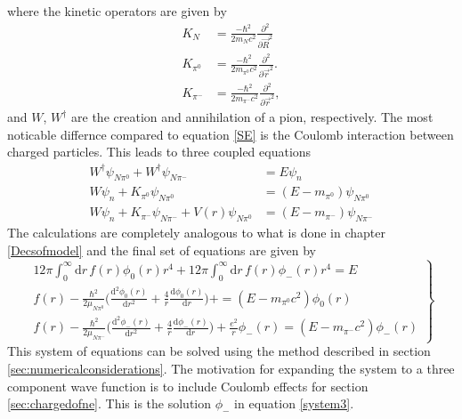 where the kinetic operators are given by
\begin{align} \label{multiNNeutron}
	K_N &= \frac{-\hbar^2}{2 m_N c^2} \frac{\partial^2}{\partial \vec{R}^2} \\
	K_{\pi^0} &= \frac{-\hbar^2}{2 m_{\pi^0} c^2} \frac{\partial^2}{\partial \vec{r}^2} \label{kinpiNeutron1}. \\
	K_{\pi^-}&= \frac{-\hbar^2}{2 m_{\pi^{-}} c^2} \frac{\partial^2}{\partial \vec{r}^2} \label{kinpiNeutron2},
\end{align} 
and $W$, $W^\dagger$ are the creation and annihilation of a pion, respectively. The most noticable differnce compared to equation \eqref{SE} is the Coulomb interaction between charged particles. This leads to three coupled equations 
\begin{align}
	W^\dagger \psi_{N\pi^0}+W^\dagger \psi_{N\pi^-} & = E\psi_n \\    
	W\psi_n + K_{\pi^0}\psi_{N\pi^0} &=(E-m_{\pi^0})\psi_{N\pi^0} \\
	W\psi_n + K_{\pi^-}\psi_{N\pi^-}+V(r)\psi_{N\pi^0} &=(E-m_{\pi^-})\psi_{N\pi^-}
\end{align}
The calculations are completely analogous to what is done in chapter \ref{Decsofmodel} and the final set of equations are given by
\begin{equation} \label{system3}
	\left.
	\begin{array}{ll}
		12\pi \int_0^\infty  \text{d}r \, f(r) \phi_0(r) r^4 + 12\pi \int_0^\infty  \text{d}r \, f(r) \phi_-(r) r^4 = E \\
		f(r) -\frac{\hbar^2}{2\mu_{N{\pi^0}}}\Big(\frac{\text{d}^2 \phi_0(r)}{\text{d}r^2}+\frac{4}{r}\frac{\text{d}\phi_0(r)}{\text{d}r}\Big)+ = (E-m_{\pi^0} c^2)\phi_0(r) \\
		f(r) -\frac{\hbar^2}{2\mu_{N\pi^{-}}}\Big(\frac{\text{d}^2 \phi_{-}(r)}{\text{d}r^2}+\frac{4}{r}\frac{\text{d}\phi_{-}(r)}{\text{d}r}\Big) +\frac{e^2}{r}\phi_{-}(r)= (E-m_{\pi^-} c^2 )\phi_-(r)
	\end{array}
	\right \} 
\end{equation}
This system of equations can be solved using the method described in section \ref{sec:numericalconsiderations}. The motivation for expanding the system to a three component wave function is to include Coulomb effects for section \ref{sec:chargedofne}. This is the solution $\phi_{-}$ in equation \eqref{system3}.


